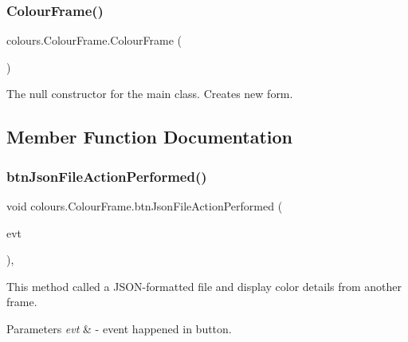 \subsubsection{\texorpdfstring{Colour\+Frame()}{ColourFrame()}}
{\footnotesize\ttfamily colours.\+Colour\+Frame.\+Colour\+Frame (\begin{DoxyParamCaption}{ }\end{DoxyParamCaption})\hspace{0.3cm}{\ttfamily [inline]}}

The null constructor for the main class. Creates new form. 

\subsection{Member Function Documentation}
\mbox{\label{classcolours_1_1_colour_frame_ab959355834a40b99a18e05e5121417c5}} 
\subsubsection{\texorpdfstring{btn\+Json\+File\+Action\+Performed()}{btnJsonFileActionPerformed()}}
{\footnotesize\ttfamily void colours.\+Colour\+Frame.\+btn\+Json\+File\+Action\+Performed (\begin{DoxyParamCaption}\item[{java.\+awt.\+event.\+Action\+Event}]{evt }\end{DoxyParamCaption})\hspace{0.3cm}{\ttfamily [inline]}, {\ttfamily [private]}}

This method called a J\+S\+O\+N-\/formatted file and display color details from another frame. 
\begin{DoxyParams}{Parameters}
{\em evt} & -\/ event happened in button. \\
\hline
\end{DoxyParams}
\mbox{\label{classcolours_1_1_colour_frame_ad1dd5e41e9cc42f135ff3c1b343ff761}} 
